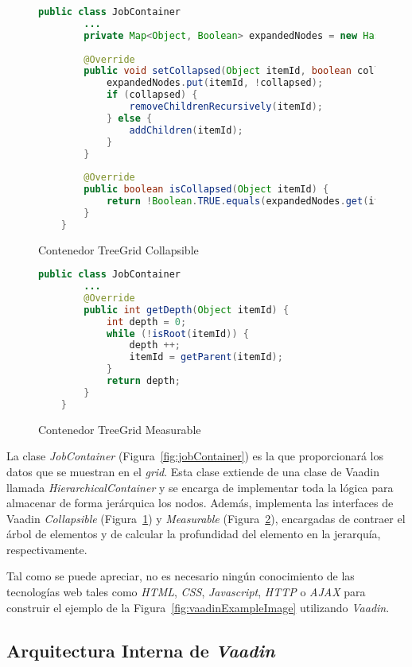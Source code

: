 \begin{figure}[H]
	\centering
	\begin{lstlisting}[language=Java]
	public class JobContainer
		...
		private Map<Object, Boolean> expandedNodes = new HashMap<>();
		
		@Override
		public void setCollapsed(Object itemId, boolean collapsed) {
			expandedNodes.put(itemId, !collapsed);	
			if (collapsed) {
				removeChildrenRecursively(itemId);
			} else {
				addChildren(itemId);
			}
		}
		
		@Override
		public boolean isCollapsed(Object itemId) {
			return !Boolean.TRUE.equals(expandedNodes.get(itemId));
		}
	}\end{lstlisting}
	\caption{Contenedor TreeGrid Collapsible}
	\label{fig:jobContainerCollapsible}
\end{figure}

\begin{figure}[H]
	\centering
	\begin{lstlisting}[language=Java]	
	public class JobContainer	
		...
		@Override
		public int getDepth(Object itemId) {
			int depth = 0;
			while (!isRoot(itemId)) {
				depth ++;
				itemId = getParent(itemId);
			}
			return depth;
		}
	}\end{lstlisting}
	\caption{Contenedor TreeGrid Measurable}
	\label{fig:jobContainerMeasurable}
\end{figure}

La clase \emph{JobContainer} (Figura~\ref{fig:jobContainer}) es la que proporcionará los datos que se muestran en el \emph{grid}. Esta clase extiende de una clase de Vaadin llamada \emph{HierarchicalContainer} y se encarga de implementar toda la lógica para almacenar de forma jerárquica los nodos. Además, implementa las interfaces de Vaadin \emph{Collapsible} (Figura~\ref{fig:jobContainerCollapsible}) y \emph{Measurable} (Figura~\ref{fig:jobContainerMeasurable}), encargadas de contraer el árbol de elementos y de calcular la profundidad del elemento en la jerarquía, respectivamente.

Tal como se puede apreciar, no es necesario ningún conocimiento de las tecnologías web tales como \emph{HTML}\cite{htmlcssjs}, \emph{CSS}\cite{htmlcssjs}, \emph{Javascript}\cite{htmlcssjs}, \emph{HTTP}\cite{http} o \emph{AJAX}\cite{ajax} para construir el ejemplo de la Figura~\ref{fig:vaadinExampleImage} utilizando \emph{Vaadin}.

\subsection{Arquitectura Interna de \emph{Vaadin}}

